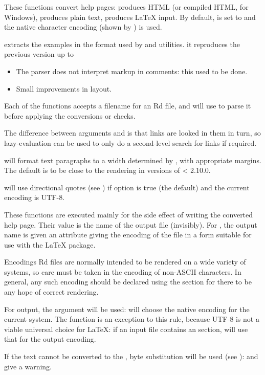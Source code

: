 \begin{Details}\relax
These functions convert help pages:  produces HTML (or
compiled HTML, for Windows),  produces plain text,
 produces LaTeX input.  By default,
 is set to  and the native character
encoding (shown by ) is used.

 extracts the examples in the format used by
 and \R{} utilities.  it reproduces the previous
version up to
\begin{itemize}

\item The parser does not interpret markup in \R{} comments: this used
to be done.
\item Small improvements in layout.

\end{itemize}

Each of the functions accepts a filename for an Rd file, and
will use  to parse it before applying the
conversions or checks.

The difference between arguments  and  is that
links are looked in them in turn, so lazy-evaluation can be used to
only do a second-level search for links if required.

 will format text paragraphs to a width determined by
, with appropriate margins.  The default is to be close to
the rendering in versions of \R{} < 2.10.0.

 will use directional quotes (see )
if option  is true (the default) and
the current encoding is UTF-8.
\end{Details}
%
\begin{Value}
These functions are executed mainly for the side effect of
writing the converted help page.  Their value is the name of the output
file (invisibly).  For , the output name is given an
attribute  giving the encoding of the file in a
form suitable for use with the LaTeX  package.
\end{Value}
%
\begin{Section}{Encodings}
Rd files are normally intended to be rendered on a wide variety of
systems, so care must be taken in the encoding of non-ASCII
characters.  In general, any such encoding should be declared using
the  section for there to be any hope of correct
rendering.

For output, the  argument will be used:
 will choose the native encoding for the
current system.  The  function is an exception to this
rule, because UTF-8 is not a viable universal choice for LaTeX: if an
input file contains an  section,  will
use that for the output encoding.

If the text cannot be converted to the , byte
substitution will be used (see ): 
and  give a warning. 
\end{Section}
